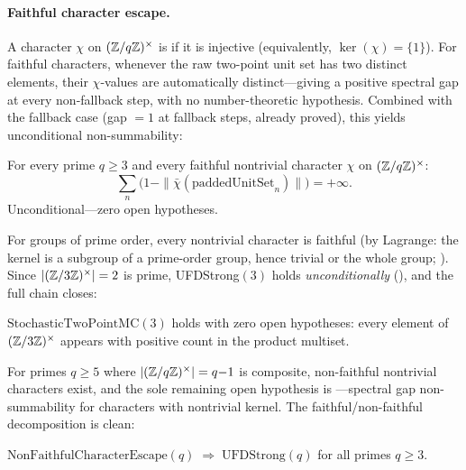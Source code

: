\paragraph{Faithful character escape.}
A character $\chi$ on $(\mathbb{Z}/q\mathbb{Z})^\times$ is  if it
is injective (equivalently, $\ker(\chi) = \{1\}$).  For faithful
characters, whenever the raw two-point unit set has two distinct
elements, their $\chi$-values are automatically distinct---giving a
positive spectral gap at every non-fallback step, with no
number-theoretic hypothesis.  Combined with the fallback case (gap $= 1$
at fallback steps, already proved), this yields unconditional
non-summability:

\begin{theorem}
\label{thm:faithful-escape}
For every prime $q \geq 3$ and every faithful nontrivial character
$\chi$ on $(\mathbb{Z}/q\mathbb{Z})^\times$:
\[
  \sum_n \bigl(1 - \|\bar\chi(\text{paddedUnitSet}_n)\|\bigr)
  = +\infty.
\]
Unconditional---zero open hypotheses.
\end{theorem}

\noindent For groups of prime order, every nontrivial character is
faithful (by Lagrange: the kernel is a subgroup of a prime-order group,
hence trivial or the whole group;
).
Since $|(\mathbb{Z}/3\mathbb{Z})^\times| = 2$ is prime, UFDStrong$(3)$ holds
\emph{unconditionally}
(), and
the full chain closes:

\begin{theorem}
\label{thm:variant-mc-3}
$\mathrm{StochasticTwoPointMC}(3)$ holds with zero open hypotheses:
every element of $(\mathbb{Z}/3\mathbb{Z})^\times$ appears with positive count
in the product multiset.
\end{theorem}

\noindent For primes $q \geq 5$ where $|(\mathbb{Z}/q\mathbb{Z})^\times| = q{-}1$ is
composite, non-faithful nontrivial characters exist, and the sole
remaining open hypothesis is
---spectral gap non-summability
for characters with nontrivial kernel.  The faithful/non-faithful
decomposition is clean:

\begin{theorem}
\label{thm:nfce-ufdstrong}
$\mathrm{NonFaithfulCharacterEscape}(q)
\;\Longrightarrow\; \mathrm{UFDStrong}(q)$
for all primes $q \geq 3$.
\end{theorem}


